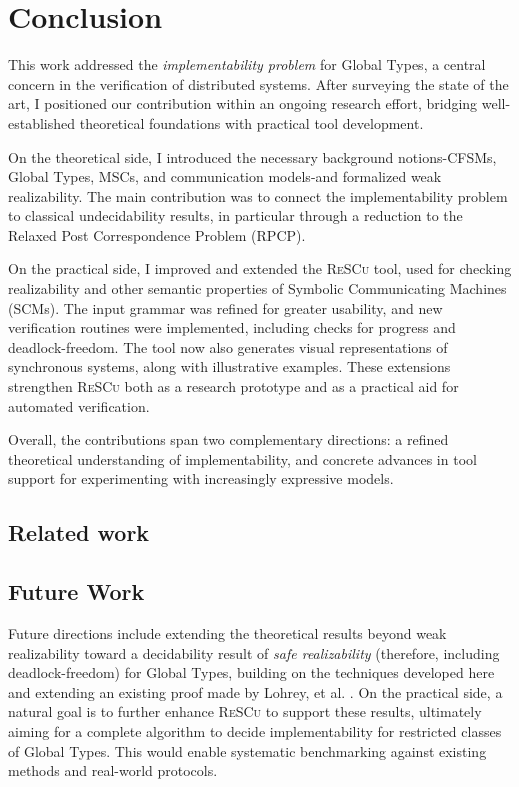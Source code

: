 \chapter{Conclusion}\label{sec:end}
This work addressed the \emph{implementability problem} for Global 
Types, a central concern in the verification of distributed systems. 
After surveying the state of the art, I positioned our contribution 
within an ongoing research effort, bridging well-established 
theoretical foundations with practical tool development.  

On the theoretical side, I introduced the necessary background 
notions-CFSMs, Global Types, MSCs, and communication models-and 
formalized weak realizability. The main contribution was to connect 
the implementability problem to classical undecidability results, in 
particular through a reduction to the Relaxed Post Correspondence 
Problem (RPCP).  

On the practical side, I improved and extended the 
\textsc{ReSCu} tool, used for checking realizability and other semantic 
properties of Symbolic Communicating Machines (SCMs). The input grammar 
was refined for greater usability, and new verification routines were 
implemented, including checks for progress and deadlock-freedom. The tool 
now also generates visual representations of synchronous systems, along 
with illustrative examples. These extensions strengthen 
\textsc{ReSCu} both as a research prototype and as a practical aid for 
automated verification.  

Overall, the contributions span two complementary directions: a refined 
theoretical understanding of implementability, and concrete advances in 
tool support for experimenting with increasingly expressive models. 

\section{Related work}



\section{Future Work}
Future directions include extending the theoretical results beyond weak 
realizability toward a decidability result of \emph{safe realizability} 
(therefore, including deadlock-freedom) for 
Global Types, building on the techniques developed here and extending
an existing proof made by Lohrey, et al. \cite{lohrey2003realizability}.
On the practical side, a natural goal is to further enhance \textsc{ReSCu} to  
support these results, ultimately aiming for a complete algorithm to decide 
implementability for restricted classes of Global Types. This would 
enable systematic benchmarking against existing methods and real-world 
protocols.